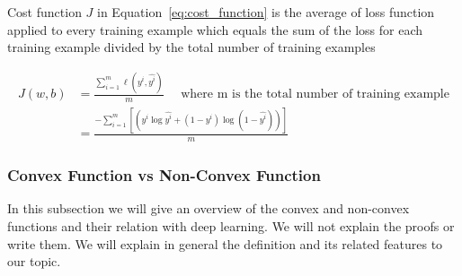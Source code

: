 Cost function \textbf{\textit{$J$}} in Equation~\eqref{eq:cost_function} is the average of loss function applied to every training example which equals the sum of the loss for each training example divided by the total number of training examples

\begin{equation}\label{eq:cost_function}
 \begin{split}
 J(w,b) & = \frac{\sum_{i=1}^{m} \ell(y^i,\widehat{y^i})}{m} \quad \text{ where m is the total number of training example} \\
 & = \frac {- \sum_{i=1}^{m} [(y^i \log \widehat{y^i} + (1-y^i) \log (1-\widehat{y^i}))]}{m} 
 \end{split}
\end{equation}


\subsubsection{Convex Function vs Non-Convex Function }

In this subsection we will give an overview of the convex and non-convex functions and their relation with deep learning. We will not explain the proofs or write them. We will explain in general the definition and its related features to our topic.

